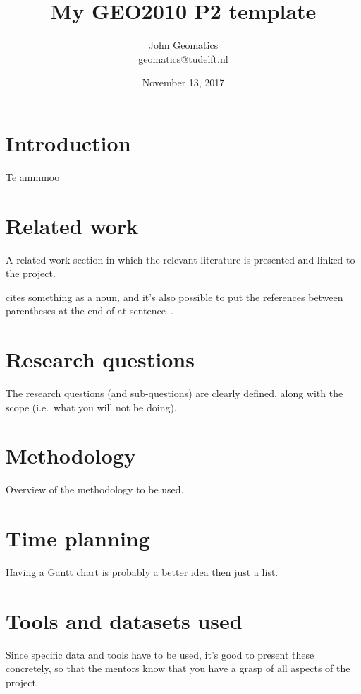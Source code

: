 \documentclass[a4paper,11pt]{scrartcl}
\title{My GEO2010 P2 template}
\author{John Geomatics\\ \url{geomatics@tudelft.nl}}
\date{November 13, 2017}
\newcommand{\ie}{i.e.}
\begin{document}
	
	\maketitle
	
	
	\section{Introduction}
Te ammmoo
	
	\section{Related work}
	A related work section in which the relevant literature is presented and linked to the project.
	
	\citet{Delaunay34} cites something as a noun, and it's also possible to put the references between parentheses at the end of at sentence~\citep{Voronoi08}.
	
	\section{Research questions}
	The research questions (and sub-questions) are clearly defined, along with the scope (\ie\ what you will not be doing).
	
	
	\section{Methodology}
	Overview of the methodology to be used.
	
	\section{Time planning}
	Having a Gantt chart is probably a better idea then just a list.
	
	\section{Tools and datasets used}
	Since specific data and tools have to be used, it’s good to present these concretely, so that the mentors know that you have a grasp of all aspects of the project.
	
	
	
	
\end{document}
